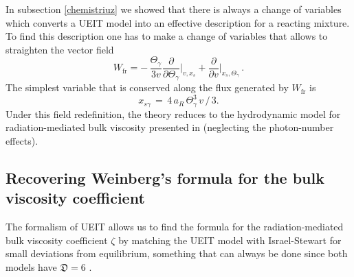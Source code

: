 \documentclass[a4paper, amsfonts, amssymb, amsmath, reprint, twocolumn, showkeys, nofootinbib]{revtex4-2}
\begin{document}
In subsection \ref{chemistriuz} we showed that there is always a change of variables which converts a UEIT model into an effective description for a reacting mixture. To find this description one has to make a change of variables that allows to straighten the vector field 
\begin{equation}
W_{\text{fr}}=  - \, \dfrac{\Theta_\gamma}{3v}\dfrac{\partial}{\partial \Theta_\gamma} \bigg|_{v,x_s} 
+ \dfrac{\partial}{\partial v} \bigg|_{x_s,\Theta_\gamma} \, .
\end{equation}
The simplest variable that is conserved along the flux generated by $W_{\text{fr}}$ is
\begin{equation}\label{xsgMama}
x_{s\gamma} \, = \, {4 \, a_R \, \Theta_\gamma^3 \, v}\, / \,3 .
\end{equation} 
Under this field redefinition, the theory reduces to the hydrodynamic model for radiation-mediated bulk viscosity presented in \citet{GavassinoRadiazione} (neglecting the photon-number effects).

\subsection{Recovering Weinberg's formula for the bulk viscosity coefficient}

The formalism of UEIT allows us to find the formula for the radiation-mediated bulk viscosity coefficient $\zeta$ by matching the UEIT model with Israel-Stewart  for small deviations from equilibrium, something that can always be done since both models have $\mathfrak{D}=6$ \citep{BulkGavassino}.
\end{document}
